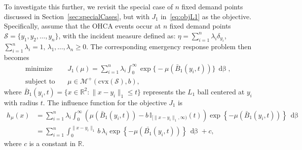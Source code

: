 \documentclass[stsy,sglanonrev]{informs4}
\newcommand{\death}{{\beta}}
\begin{document}
To investigate this further, we revisit the special case of \(n\) fixed demand points discussed in Section~\ref{sec:specialCases}, but with $J_1$ in~\eqref{eq:objL1} as the objective. Specifically, assume that the OHCA events occur at \(n\) fixed demand points \(\mathcal{S} = \{y_1, y_2, \dots, y_n \}\), with the incident measure defined as: $\eta = \sum_{i=1}^n \lambda_i \delta_{y_i}$, $\sum_{i=1}^n \lambda_i = 1$, $\lambda_1, \dots, \lambda_n \geq 0.$ The corresponding emergency response problem then becomes
\begin{align}\label{optL1}
    \text{minimize} & \quad J_1(\mu) = \sum_{i=1}^n \lambda_i \int_0^\infty \exp\Big\{-\mu(\bar{B}_1(y_i,t))\Big\} \, \mathop{d\death(t)}, \nonumber \\
    \text{subject to} & \quad \mu \in \mathcal{M}^+(\mathrm{cvx}(\mathcal{S}), b), \tag{$P(L_1)$}
\end{align}
where \(\bar{B}_1(y_i, t) = \{x \in \mathbb{R}^2 : \|x - y_i\|_1 \leq t\}\) represents the $L_1$ ball centered at \(y_i\) with radius \(t\). The influence function for the objective $J_1$ is
\begin{align}\label{eq:influenceL1}
    h_{\mu}(x) &= \sum_{i=1}^n \lambda_i \int_0^\infty 
    \left( \mu\left(\bar{B}_1(y_i,t) \right) - b \, \mathbb{I}_{[\|x-y_i\|_1, \infty)}(t) \right) 
    \exp\left\{-\mu\left(\bar{B}_1(y_i,t) \right)\right\} \, \mathop{d\death(t)} \nonumber \\ &= \sum_{i=1}^n \int_0^{\|x-y_i \|_1}  b\,\lambda_i\exp\left\{-\mu\left(\bar{B_1}(y_i,t) \right) \right\} \, \mathop{d\death(t)} + c,
\end{align} where $c$ is a constant in $\mathbb{R}$.  
\end{document}

